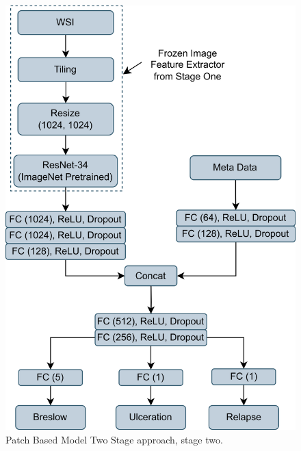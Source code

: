 \documentclass[conference]{IEEEtran}
\begin{document}
\begin{figure}[h!]
  \centering
    \includegraphics[scale=0.55]{images/page4.png}
  \caption{Patch Based Model Two Stage approach, stage two.}
  \label{fig:pbm_s2}
\end{figure}
\end{document}
